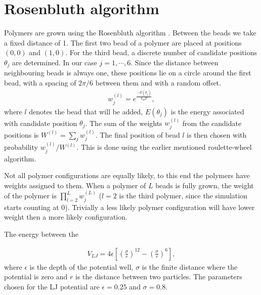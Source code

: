 \section{Rosenbluth algorithm}
Polymers are grown using the Rosenbluth algorithm \cite{rosenbluth1955monte}. Between the beads we take a fixed distance of 1. The first two bead of a polymer are placed at positions $(0,0)$ and $(1,0)$. For the third bead, a discrete number of candidate positions $\theta_j$ are determined. In our case $j=1,\cdots,6$. Since the distance between neighbouring beads is always one, these positions lie on a circle around the first bead, with a spacing of $2\pi/6$ between them and with a random offset. 
\begin{gather}
    w_j^{(l)} = e^\frac{-E(\theta_j)}{k_BT},
\end{gather} where $l$ denotes the bead that will be added, $E(\theta_j)$ is the energy associated with candidate position $\theta_j$. The sum of the weights $w_j^{(l)}$ from the candidate positions is $W^{(l)} = \sum_j w_j^{(l)}$. The final position of bead $l$ is then chosen with probability $w_j^{(l)}/W^{(l)}$. This is done using the earlier mentioned roulette-wheel algorithm. 

Not all polymer configurations are equally likely, to this end the polymers have weights assigned to them. When a polymer of $L$ beads is fully grown, the weight of the polymer is $\prod_{l=2}^L w_j^{(L)}$ ($l=2$ is the third polymer, since the simulation starts counting at $0$). Trivially a less likely polymer configuration will have lower weight then a more likely configuration.

The energy between the

\begin{gather}
    V_{LJ} = 4\epsilon \left[ \left(\frac{\sigma}{r}\right)^{12} - \left(\frac{\sigma}{r}\right)^{6} \right] ,
\end{gather} where $\epsilon$ is the depth of the potential well, $\sigma$ is the finite distance where the potential is zero and $r$ is the distance between two particles. The parameters chosen for the LJ potential are $\epsilon=0.25$ and $\sigma=0.8$.